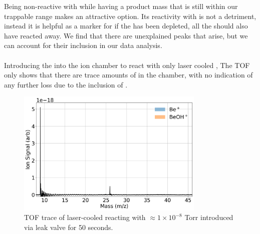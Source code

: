 Being non-reactive with  while having a product mass that is still within our trappable range makes  an attractive option. Its reactivity with  is not a detriment, instead it is helpful as a marker for if the  has been depleted, all the  should also have reacted away. We find that there are unexplained peaks that arise, but we can account for their inclusion in our data analysis.

%


\paragraph{}
Introducing the  into the ion chamber to react with only laser cooled , The TOF only shows that there are trace amounts of  in the chamber, with no indication of any further loss due to the inclusion of .

\begin{figure}[H]
	\label{fig: Be+CO2 TOF}
	\centering
	\includegraphics[width=0.8\textwidth]{images/Be_CO2_TOF.png}
	\caption{TOF trace of laser-cooled  reacting with $\approx 1 \times 10^{-8}$ Torr  introduced via leak valve for 50 seconds.}
\end{figure}

